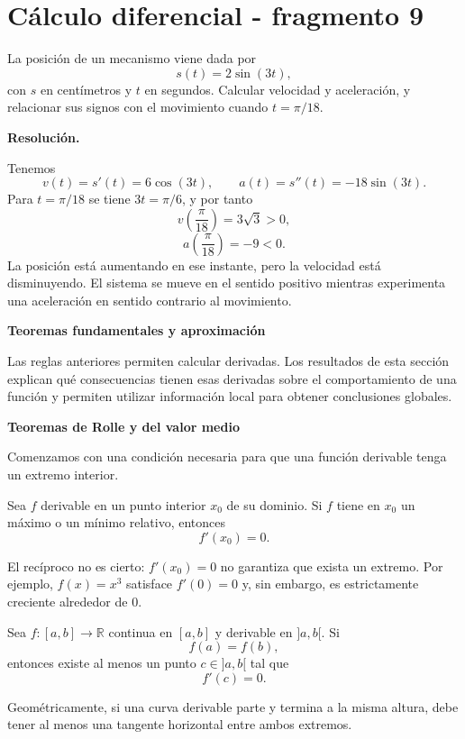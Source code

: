 \section{Cálculo diferencial - fragmento 9}
\begin{solvedexercise}
La posición de un mecanismo viene dada por
\[
s(t)=2\sin(3t),
\]
con $s$ en centímetros y $t$ en segundos. Calcular velocidad y aceleración, y relacionar sus signos con el movimiento cuando $t=\pi/18$.

\textbf{Resolución.}\par\smallskip
Tenemos
\[
v(t)=s'(t)=6\cos(3t),
\qquad
a(t)=s''(t)=-18\sin(3t).
\]
Para $t=\pi/18$ se tiene $3t=\pi/6$, y por tanto
\[
v\!\left(\frac{\pi}{18}\right)=3\sqrt3>0,
\]
\[
a\!\left(\frac{\pi}{18}\right)=-9<0.
\]
La posición está aumentando en ese instante, pero la velocidad está disminuyendo. El sistema se mueve en el sentido positivo mientras experimenta una aceleración en sentido contrario al movimiento.
\end{solvedexercise}

\textbf{Teoremas fundamentales y aproximación}

Las reglas anteriores permiten calcular derivadas. Los resultados de esta sección explican qué consecuencias tienen esas derivadas sobre el comportamiento de una función y permiten utilizar información local para obtener conclusiones globales.

\textbf{Teoremas de Rolle y del valor medio}

Comenzamos con una condición necesaria para que una función derivable tenga un extremo interior.

\begin{theorem}
Sea $f$ derivable en un punto interior $x_0$ de su dominio. Si $f$ tiene en $x_0$ un máximo o un mínimo relativo, entonces
\[
f'(x_0)=0.
\]
\end{theorem}

El recíproco no es cierto: $f'(x_0)=0$ no garantiza que exista un extremo. Por ejemplo, $f(x)=x^3$ satisface $f'(0)=0$ y, sin embargo, es estrictamente creciente alrededor de $0$.

\begin{theorem}
Sea $f:[a,b]\to\mathbb{R}$ continua en $[a,b]$ y derivable en $]a,b[$. Si
\[
f(a)=f(b),
\]
entonces existe al menos un punto $c\in]a,b[$ tal que
\[
f'(c)=0.
\]
\end{theorem}

Geométricamente, si una curva derivable parte y termina a la misma altura, debe tener al menos una tangente horizontal entre ambos extremos.

